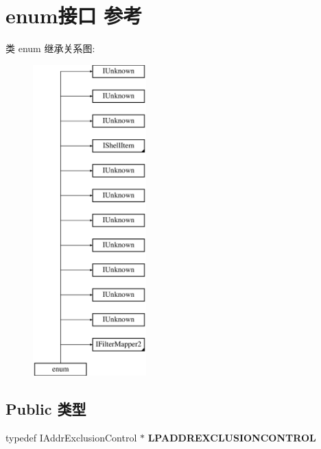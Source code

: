 \hypertarget{interfaceenum}{}\section{enum接口 参考}
\label{interfaceenum}
类 enum 继承关系图\+:\begin{figure}[H]
\begin{center}
\leavevmode
\includegraphics[height=12.000000cm]{interfaceenum}
\end{center}
\end{figure}
\subsection*{Public 类型}
\begin{DoxyCompactItemize}
\item 
\mbox{\label{interfaceenum_a4de3a956ecb53ef541ef29ca313d60dc}} 
typedef I\+Addr\+Exclusion\+Control $\ast$ {\bfseries L\+P\+A\+D\+D\+R\+E\+X\+C\+L\+U\+S\+I\+O\+N\+C\+O\+N\+T\+R\+OL}
\end{DoxyCompactItemize}
